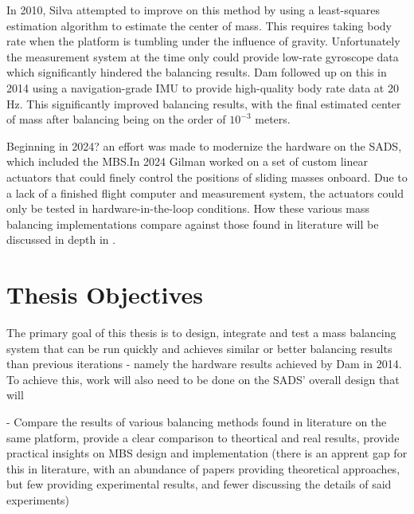 In 2010, Silva attempted to improve on this method by using a least-squares estimation algorithm to estimate the center of mass. This requires taking body rate when the platform is tumbling under the influence of gravity. Unfortunately the measurement system at the time only could provide low-rate gyroscope data which significantly hindered the balancing results. Dam followed up on this in 2014 using a navigation-grade IMU to provide high-quality body rate data at 20 Hz. This significantly improved balancing results, with the final estimated center of mass after balancing being on the order of $10^{-3}$ meters.

Beginning in 2024? an effort was made to modernize the hardware on the SADS, which included the MBS.\@ In 2024 Gilman worked on a set of custom linear actuators that could finely control the positions of sliding masses onboard. Due to a lack of a finished flight computer and measurement system, the actuators could only be tested in hardware-in-the-loop conditions. How these various mass balancing implementations compare against those found in literature will be discussed in depth in . 


\section{Thesis Objectives}

The primary goal of this thesis is to design, integrate and test a mass balancing system that can be run quickly and achieves similar or better balancing results than previous iterations - namely the hardware results achieved by Dam in 2014. To achieve this, work will also need to be done on the SADS' overall design that will 

- Compare the results of various balancing methods found in literature on the same platform, provide a clear comparison to theortical and real results, provide practical insights on MBS design and implementation (there is an apprent gap for this in literature, with an abundance of papers providing theoretical approaches, but few providing experimental results, and fewer discussing the details of said experiments)
